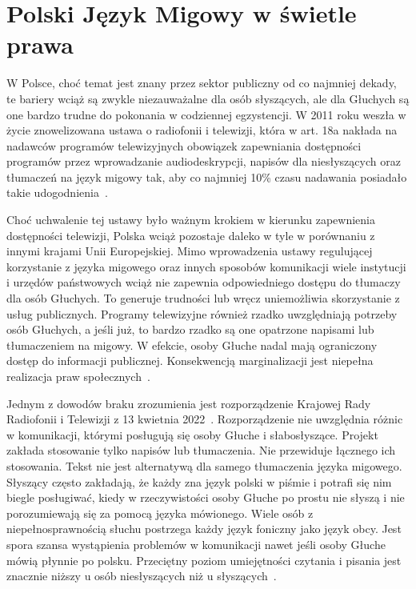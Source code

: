 \section{Polski Język Migowy w świetle prawa}
\label{sec:polish-sign-language}

W Polsce, choć temat jest znany przez sektor publiczny od co najmniej dekady, te bariery wciąż są zwykle niezauważalne dla osób słyszących, ale dla Głuchych są one bardzo trudne do pokonania w codziennej egzystencji. W 2011 roku weszła w życie znowelizowana ustawa o radiofonii i telewizji, która w art. 18a nakłada na nadawców programów telewizyjnych obowiązek zapewniania dostępności programów przez wprowadzanie audiodeskrypcji, napisów dla niesłyszących oraz tłumaczeń na język migowy tak, aby co najmniej 10\% czasu nadawania posiadało takie udogodnienia~\cite{ustawa1992}.

Choć uchwalenie tej ustawy było ważnym krokiem w kierunku zapewnienia dostępności telewizji, Polska wciąż pozostaje daleko w tyle w porównaniu z innymi krajami Unii Europejskiej. Mimo wprowadzenia ustawy regulującej korzystanie z języka migowego oraz innych sposobów komunikacji wiele instytucji i urzędów państwowych wciąż nie zapewnia odpowiedniego dostępu do tłumaczy dla osób Głuchych. To generuje trudności lub wręcz uniemożliwia skorzystanie z usług publicznych. Programy telewizyjne również rzadko uwzględniają potrzeby osób Głuchych, a jeśli już, to bardzo rzadko są one opatrzone napisami lub tłumaczeniem na migowy. W efekcie, osoby Głuche nadal mają ograniczony dostęp do informacji publicznej. Konsekwencją marginalizacji jest niepełna realizacja praw społecznych~\cite{teper2016}.

Jednym z dowodów braku zrozumienia jest rozporządzenie Krajowej Rady Radiofonii i Telewizji z 13 kwietnia 2022~\cite{rozporzadzenie2022}. Rozporządzenie nie uwzględnia różnic w komunikacji, którymi posługują się osoby Głuche i słabosłyszące. Projekt zakłada stosowanie tylko napisów lub tłumaczenia. Nie przewiduje łącznego ich stosowania. Tekst nie jest alternatywą dla samego tłumaczenia języka migowego. Słyszący często zakładają, że każdy zna język polski w piśmie i potrafi się nim biegle posługiwać, kiedy w rzeczywistości osoby Głuche po prostu nie słyszą i nie porozumiewają się za pomocą języka mówionego. Wiele osób z niepełnosprawnością słuchu postrzega każdy język foniczny jako język obcy. Jest spora szansa wystąpienia problemów w komunikacji nawet jeśli osoby Głuche mówią płynnie po polsku. Przeciętny poziom umiejętności czytania i pisania jest znacznie niższy u osób niesłyszących niż u słyszących~\cite{perfetti2000}.
